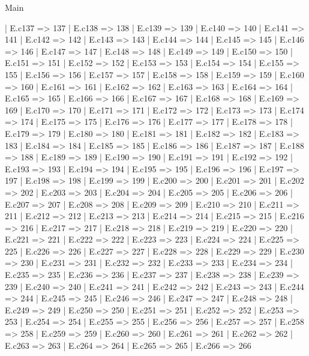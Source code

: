 \begin{lexlean}{Main}
\begin{semanticmodule}
{    | E.c137 => 137
    | E.c138 => 138
    | E.c139 => 139
    | E.c140 => 140
    | E.c141 => 141
    | E.c142 => 142
    | E.c143 => 143
    | E.c144 => 144
    | E.c145 => 145
    | E.c146 => 146
    | E.c147 => 147
    | E.c148 => 148
    | E.c149 => 149
    | E.c150 => 150
    | E.c151 => 151
    | E.c152 => 152
    | E.c153 => 153
    | E.c154 => 154
    | E.c155 => 155
    | E.c156 => 156
    | E.c157 => 157
    | E.c158 => 158
    | E.c159 => 159
    | E.c160 => 160
    | E.c161 => 161
    | E.c162 => 162
    | E.c163 => 163
    | E.c164 => 164
    | E.c165 => 165
    | E.c166 => 166
    | E.c167 => 167
    | E.c168 => 168
    | E.c169 => 169
    | E.c170 => 170
    | E.c171 => 171
    | E.c172 => 172
    | E.c173 => 173
    | E.c174 => 174
    | E.c175 => 175
    | E.c176 => 176
    | E.c177 => 177
    | E.c178 => 178
    | E.c179 => 179
    | E.c180 => 180
    | E.c181 => 181
    | E.c182 => 182
    | E.c183 => 183
    | E.c184 => 184
    | E.c185 => 185
    | E.c186 => 186
    | E.c187 => 187
    | E.c188 => 188
    | E.c189 => 189
    | E.c190 => 190
    | E.c191 => 191
    | E.c192 => 192
    | E.c193 => 193
    | E.c194 => 194
    | E.c195 => 195
    | E.c196 => 196
    | E.c197 => 197
    | E.c198 => 198
    | E.c199 => 199
    | E.c200 => 200
    | E.c201 => 201
    | E.c202 => 202
    | E.c203 => 203
    | E.c204 => 204
    | E.c205 => 205
    | E.c206 => 206
    | E.c207 => 207
    | E.c208 => 208
    | E.c209 => 209
    | E.c210 => 210
    | E.c211 => 211
    | E.c212 => 212
    | E.c213 => 213
    | E.c214 => 214
    | E.c215 => 215
    | E.c216 => 216
    | E.c217 => 217
    | E.c218 => 218
    | E.c219 => 219
    | E.c220 => 220
    | E.c221 => 221
    | E.c222 => 222
    | E.c223 => 223
    | E.c224 => 224
    | E.c225 => 225
    | E.c226 => 226
    | E.c227 => 227
    | E.c228 => 228
    | E.c229 => 229
    | E.c230 => 230
    | E.c231 => 231
    | E.c232 => 232
    | E.c233 => 233
    | E.c234 => 234
    | E.c235 => 235
    | E.c236 => 236
    | E.c237 => 237
    | E.c238 => 238
    | E.c239 => 239
    | E.c240 => 240
    | E.c241 => 241
    | E.c242 => 242
    | E.c243 => 243
    | E.c244 => 244
    | E.c245 => 245
    | E.c246 => 246
    | E.c247 => 247
    | E.c248 => 248
    | E.c249 => 249
    | E.c250 => 250
    | E.c251 => 251
    | E.c252 => 252
    | E.c253 => 253
    | E.c254 => 254
    | E.c255 => 255
    | E.c256 => 256
    | E.c257 => 257
    | E.c258 => 258
    | E.c259 => 259
    | E.c260 => 260
    | E.c261 => 261
    | E.c262 => 262
    | E.c263 => 263
    | E.c264 => 264
    | E.c265 => 265
    | E.c266 => 266
}
\end{semanticmodule}
\end{lexlean}
